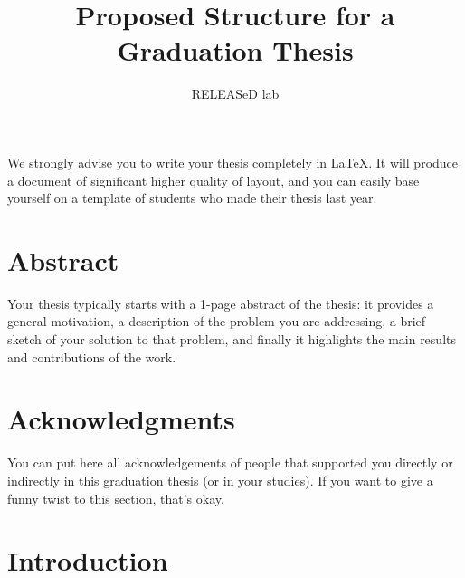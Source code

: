 \documentclass[twocolumn,british]{article}
\title{Proposed Structure for a Graduation Thesis}
\author{RELEASeD lab}
\begin{document}
\maketitle

We strongly advise you to write your thesis completely in \LaTeX. It
will produce a document of significant higher quality of layout, and
you can easily base yourself on a template of students who made their
thesis last year.

\section*{Abstract}

Your thesis typically starts with a 1-page abstract of the thesis: it provides a general motivation, a description of the problem you are addressing, a brief sketch of your solution to that problem, and finally it highlights the main results and contributions of the work.

\section*{Acknowledgments}

You can put here all acknowledgements of people that supported you directly or indirectly in this graduation thesis (or in your studies). If you want to give a funny twist to this section, that's okay.

\section*{Introduction}
\end{document}
